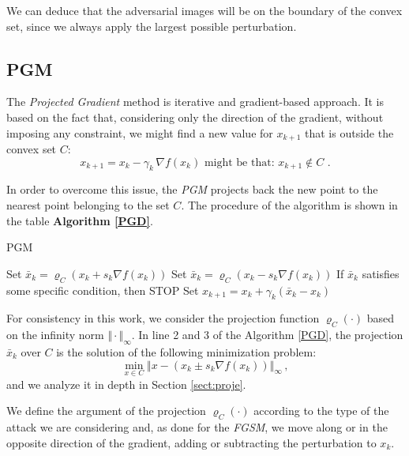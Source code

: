 \documentclass[10pt,twocolumn,letterpaper, english]{article}
\theoremstyle{definition}
\theoremstyle{plain}
\theoremstyle{plain}
\theoremstyle{plain}
\theoremstyle{plain}
\theoremstyle{remark}
\theoremstyle{remark}
\theoremstyle{definition}
\theoremstyle{definition}
\theoremstyle{definition}
\theoremstyle{definition}
\renewcommand{\rho}{\varrho}
\begin{document}
We can deduce that the adversarial images will be on the boundary of the convex set, since we always apply the largest possible perturbation. 

\subsection{PGM}

The \textit{Projected Gradient} method is iterative and gradient-based approach. 
It is based on the fact that, considering only the direction of the gradient, without imposing any constraint, we might find a new value for $x_{k+1}$ that is outside the convex set $C$: 
\begin{equation*}
    x_{k+1} = x_k - \gamma_k \, \nabla f(x_k) \text{   might be that: } x_{k+1} \notin C \,\,.
\end{equation*}

In order to overcome this issue, the \textit{PGM} projects back the new point to the nearest point belonging to the set $C$. 
The procedure of the algorithm is shown in the table \textbf{Algorithm \ref{PGD}}. 

\begin{algorithm}
\caption{PGM}\label{PGD}
\begin{algorithmic}[1]
  \State Set $ \bar{x}_k = \rho_C(x_k + s_k \nabla f(x_k))$ 
  \State Set $ \bar{x}_k = \rho_C(x_k - s_k \nabla f(x_k))$ 
  \State If $\bar{x}_k$ satisfies some specific condition, then STOP
  \State Set $x_{k+1} = x_k + \gamma_k (\bar{x}_k - x_k)$ \Comment{with $\gamma_k \in (0, 1]$}
    
\EndFor
\end{algorithmic}
\end{algorithm}

For consistency in this work, we consider the projection function $\rho_C(\cdot)$ based on the infinity norm $\Vert \cdot \Vert_\infty$. 
In line 2 and 3 of the Algorithm \ref{PGD}, the projection $\bar{x}_k$ over $C$ is the solution of the following minimization problem: 
\begin{equation*}
    \min_{x \in C} \Vert x - (x_k \pm s_k \nabla f(x_k)) \Vert_\infty \,, 
\end{equation*}
and we analyze it in depth in Section \ref{sect:proje}. 

We define the argument of the projection $\rho_C(\cdot)$ according to the type of the attack we are considering and, as done for the \textit{FGSM}, we move along or in the opposite direction of the gradient, adding or subtracting the perturbation to $x_k$. \\
\end{document}
